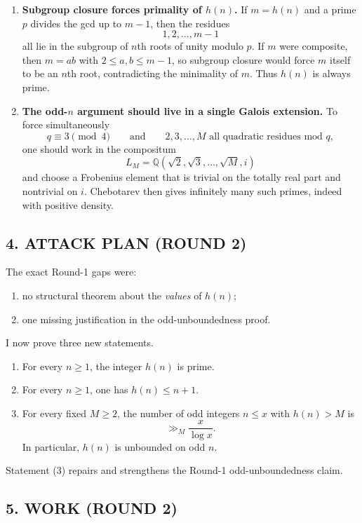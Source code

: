 \begin{enumerate}
\item \textbf{Subgroup closure forces primality of $h(n)$.}  
If $m=h(n)$ and a prime $p$ divides the gcd up to $m-1$, then the residues
\[
1,2,\dots,m-1
\]
all lie in the subgroup of $n$th roots of unity modulo $p$.
If $m$ were composite, then $m=ab$ with $2\le a,b\le m-1$, so subgroup closure would force $m$ itself to be an $n$th root, contradicting the minimality of $m$.
Thus $h(n)$ is always prime.

\item \textbf{The odd-$n$ argument should live in a single Galois extension.}  
To force simultaneously
\[
q\equiv 3\pmod 4
\qquad\text{and}\qquad
2,3,\dots,M \text{ all quadratic residues mod } q,
\]
one should work in the compositum
\[
L_M=\mathbb Q(\sqrt 2,\sqrt 3,\dots,\sqrt M,i)
\]
and choose a Frobenius element that is trivial on the totally real part and nontrivial on $i$.
Chebotarev then gives infinitely many such primes, indeed with positive density.
\end{enumerate}

\subsection*{4. ATTACK PLAN (ROUND 2)}

The exact Round-1 gaps were:

\begin{enumerate}
\item no structural theorem about the \emph{values} of $h(n)$;
\item one missing justification in the odd-unboundedness proof.
\end{enumerate}

I now prove three new statements.

\begin{enumerate}
\item For every $n\ge 1$, the integer $h(n)$ is prime.
\item For every $n\ge 1$, one has $h(n)\le n+1$.
\item For every fixed $M\ge 2$, the number of odd integers $n\le x$ with $h(n)>M$ is
\[
\gg_M \frac{x}{\log x}.
\]
In particular, $h(n)$ is unbounded on odd $n$.
\end{enumerate}

Statement (3) repairs and strengthens the Round-1 odd-unboundedness claim.

\subsection*{5. WORK (ROUND 2)}

